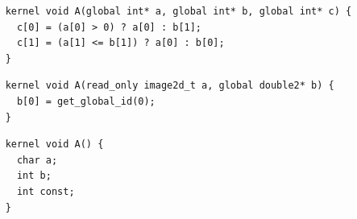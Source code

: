 \newsavebox{\BeignetTernarySmaller}
\begin{lrbox}{\BeignetTernarySmaller}
  \hspace{1.5em}
  \begin{lstlisting}
    kernel void A(global int* a, global int* b, global int* c) {
      c[0] = (a[0] > 0) ? a[0] : b[1];
      c[1] = (a[1] <= b[1]) ? a[0] : b[0];
    }
  \end{lstlisting}
\end{lrbox}

\newsavebox{\IntelGtDoubleAssertion}
\begin{lrbox}{\IntelGtDoubleAssertion}
  \hspace{1.5em}
  \begin{lstlisting}
    kernel void A(read_only image2d_t a, global double2* b) {
      b[0] = get_global_id(0);
    }
  \end{lstlisting}
\end{lrbox}

\newsavebox{\IntelDeclDoesntDeclareAnything}
\begin{lrbox}{\IntelDeclDoesntDeclareAnything}
  \hspace{1.5em}
  \begin{lstlisting}
    kernel void A() {
      char a;
      int b;
      int const;
    }
  \end{lstlisting}
\end{lrbox}


